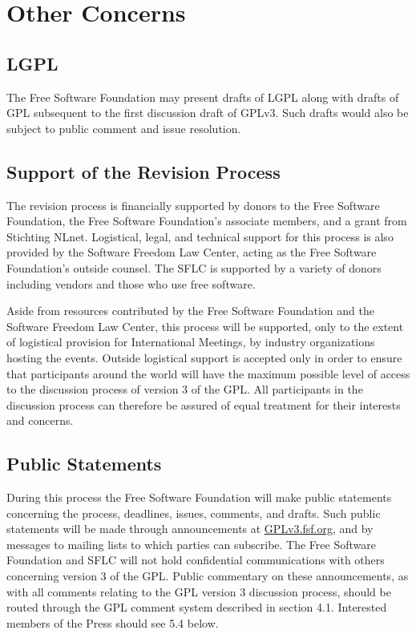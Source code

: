 \chapter{Other Concerns}


\section{LGPL}

The Free Software Foundation may present drafts of LGPL along with
drafts of GPL subsequent to the first discussion draft of GPLv3. Such
drafts would also be subject to public comment and issue resolution.

\section{Support of the Revision Process}

The revision process is financially supported by donors to the Free
Software Foundation, the Free Software Foundation's associate members, and
a grant from Stichting NLnet. Logistical, legal, and technical support for
this process is also provided by the Software Freedom Law Center, acting
as the Free Software Foundation's outside counsel. The SFLC is supported
by a variety of donors including vendors and those who use free software.

Aside from resources contributed by the Free Software Foundation and
the Software Freedom Law Center, this process will be supported, only
to the extent of logistical provision for International Meetings, by industry
organizations hosting the events. Outside logistical support is accepted
only in order to ensure that participants around the world will have the
maximum possible level of access to the discussion process of version
3 of the GPL. All participants in the discussion process can therefore be
assured of equal treatment for their interests and concerns.

\section{Public Statements}

During this process the Free Software Foundation will make public
statements concerning the process, deadlines, issues, comments, and drafts.
Such public statements will be made through announcements at \url{GPLv3.fsf.org},
and by messages to mailing lists to which parties can subscribe. The Free
Software Foundation and SFLC will not hold confidential communications with
others concerning version 3 of the GPL. Public commentary on these
announcements, as with all comments relating to the GPL version 3 discussion
process, should be routed through the GPL comment system described in
section 4.1. Interested members of the Press
should see 5.4 below.

